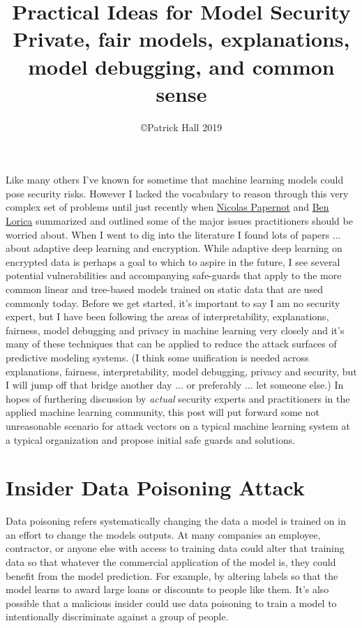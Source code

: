 \documentclass[fleqn]{article}
\title{Practical Ideas for Model Security\\
\large{Private, fair models, explanations, model debugging, and common sense}}
\author{\copyright Patrick Hall 2019}
\begin{document}
\maketitle

Like many others I've known for sometime that machine learning models could pose security risks. However I lacked the vocabulary to reason through this very complex set of problems until just recently when \href{https://arxiv.org/pdf/1811.01134.pdf}{Nicolas Papernot} and \href{https://www.oreilly.com/ideas/you-created-a-machine-learning-application-now-make-sure-its-secure}{Ben Lorica} summarized and outlined some of the major issues practitioners should be worried about. When I went to dig into the literature I found lots of papers ... about adaptive deep learning and encryption. While adaptive deep learning on encrypted data is perhaps a goal to which to aspire in the future, I see several potential vulnerabilities and accompanying safe-guards that apply to the more common linear and tree-based models trained on static data that are used commonly today.  Before we get started, it's important to say I am no security expert, but I have been following the areas of interpretability, explanations, fairness, model debugging and privacy in machine learning very closely and it's many of these techniques that can be applied to reduce the attack surfaces of predictive modeling systems. (I think some unification is needed across explanations, fairness, interpretability, model debugging, privacy and security, but I will jump off that bridge another day $\dots$ or preferably $\dots$ let someone else.) In hopes of furthering discussion by \textit{actual} security experts and practitioners in the applied machine learning community, this post will put forward some not unreasonable scenario for attack vectors on a typical machine learning system at a typical organization and propose initial safe guards and solutions. 

\section{Insider Data Poisoning Attack} \label{sec:data_poisoning}

Data poisoning refers systematically changing the data a model is trained on in an effort to change the models outputs. At many companies an employee, contractor, or anyone else with access to training data could alter that training data so that whatever the commercial application of the model is, they could benefit from the model prediction.  For example, by altering labels so that the model learns to award large loans or discounts to people like them. It's also possible that a malicious insider could use data poisoning to train a model to intentionally discriminate against a group of people.\\
\end{document}
